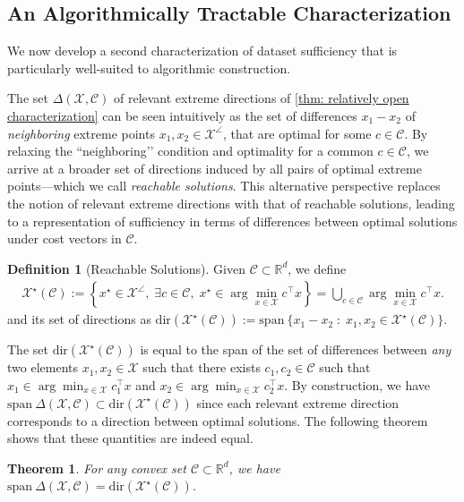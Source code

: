 \documentclass[11pt]{article}
\theoremstyle{plain}
\newtheorem{theorem}{Theorem}
\theoremstyle{definition}
\newtheorem{definition}{Definition}
\newcommand{\R}[0]{\mathbb R}
\newcommand{\Vect}{\mathrm{span}~}
\newcommand{\dualpoly}[2]{#1^\star\left(#2\right)}
\newcommand{\cX}{\mathcal{X}}
\newcommand{\cC}{\mathcal{C}}
\newcommand{\dir}[1]{\mathrm{dir}\left(#1\right)}
\begin{document}
    \subsection{An Algorithmically Tractable Characterization}
    We now develop a second characterization of dataset sufficiency that is particularly well-suited to algorithmic construction.

   The set $\Delta(\cX,\cC)$ of relevant extreme directions of \cref{thm: relatively open characterization} can be seen intuitively as the set of differences $x_1-x_2$ of \textit{neighboring} extreme points $x_1,x_2\in \cX^\angle$, that are optimal for some $c \in \cC$. By relaxing the ``neighboring’’ condition and optimality for a common $c\in \cC$, we arrive at a broader set of directions induced by all pairs of optimal extreme points---which we call \textit{reachable solutions}. This alternative perspective replaces the notion of relevant extreme directions with that of reachable solutions, leading to a representation of sufficiency in terms of differences between optimal solutions under cost vectors in \(\mathcal{C}\).

\begin{definition}[Reachable Solutions]
    Given $\cC\subset \R^d$, we define 
    \begin{align*}
        \dualpoly{\cX}{\cC}:=\left\{x^\star\in \cX^\angle,\;\exists c \in \cC,\; x^\star\in \arg\min_{x\in \cX}c^\top x \right\}=\bigcup_{c\in \cC}^{}\arg\min_{x\in \cX}c^\top x.
    \end{align*} 
and its set of directions as $\dir{\dualpoly{\cX}{\cC}} := \Vect\{x_1 - x_2 \; : \; x_1,x_2 \in  \dualpoly{\cX}{\cC}\}$.
\end{definition}

The set $\dir{\dualpoly{\cX}{\cC}}$ is equal to the span of the set of differences between \textit{any} two elements $x_1,x_2\in \cX$ such that there exists $c_1,c_2 \in \cC$ such that $x_1\in \arg\min_{x\in \cX}c_1^\top x$ and $x_2\in \arg\min_{x\in \cX}c_2^\top x$. By construction, we have $\Vect \Delta(\cX,\cC) \subset \dir{\dualpoly{\cX}{\cC}}$ since each relevant extreme direction corresponds to a direction between optimal solutions. The following theorem shows that these quantities are indeed equal.

\begin{theorem}\label{thm:span delta is dir x}
    For any convex set $\cC\subset \R^d$, we have $\Vect \Delta(\cX,\cC)=\dir{\dualpoly{\cX}{\cC}}$.
\end{theorem}
\end{document}
